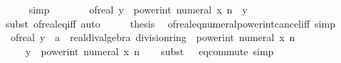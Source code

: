 \begin{isabellebody}
\ \ \ \ \isamarkupfalse%
\ simp\isanewline
\ \ \isamarkupfalse%
\ \isamarkupfalse%
\ {\isachardoublequoteopen}{\isasymdots}\ {\isacharequal}{\kern0pt}\ of{\isacharunderscore}{\kern0pt}real\ y\ {\isasymlongleftrightarrow}\ power{\isacharunderscore}{\kern0pt}int\ {\isacharparenleft}{\kern0pt}numeral\ x{\isacharparenright}{\kern0pt}\ n\ {\isacharequal}{\kern0pt}\ y{\isachardoublequoteclose}\isanewline
\ \ \ \ \isamarkupfalse%
\ {\isacharparenleft}{\kern0pt}subst\ of{\isacharunderscore}{\kern0pt}real{\isacharunderscore}{\kern0pt}eq{\isacharunderscore}{\kern0pt}iff{\isacharparenright}{\kern0pt}\ auto\isanewline
\ \ \isamarkupfalse%
\ \isamarkupfalse%
\ {\isacharquery}{\kern0pt}thesis\ \isacommand{{\isachardot}{\kern0pt}}\isamarkupfalse%
\isanewline
{}\isamarkupfalse%
%
\endisatagproof
{\isafoldproof}%
%
\isadelimproof
\isanewline
%
\endisadelimproof
\isanewline
{}\isamarkupfalse%
\ of{\isacharunderscore}{\kern0pt}real{\isacharunderscore}{\kern0pt}eq{\isacharunderscore}{\kern0pt}numeral{\isacharunderscore}{\kern0pt}power{\isacharunderscore}{\kern0pt}int{\isacharunderscore}{\kern0pt}cancel{\isacharunderscore}{\kern0pt}iff\ {\isacharbrackleft}{\kern0pt}simp{\isacharbrackright}{\kern0pt}{\isacharcolon}{\kern0pt}\isanewline
\ \ {\isachardoublequoteopen}{\isacharparenleft}{\kern0pt}of{\isacharunderscore}{\kern0pt}real\ y\ {\isacharcolon}{\kern0pt}{\isacharcolon}{\kern0pt}\ {\isacharprime}{\kern0pt}a\ {\isacharcolon}{\kern0pt}{\isacharcolon}{\kern0pt}\ {\isacharbraceleft}{\kern0pt}real{\isacharunderscore}{\kern0pt}div{\isacharunderscore}{\kern0pt}algebra{\isacharcomma}{\kern0pt}\ division{\isacharunderscore}{\kern0pt}ring{\isacharbraceright}{\kern0pt}{\isacharparenright}{\kern0pt}\ {\isacharequal}{\kern0pt}\ power{\isacharunderscore}{\kern0pt}int\ {\isacharparenleft}{\kern0pt}numeral\ x{\isacharparenright}{\kern0pt}\ n\ {\isasymlongleftrightarrow}\isanewline
\ \ \ \ \ y\ {\isacharequal}{\kern0pt}\ power{\isacharunderscore}{\kern0pt}int\ {\isacharparenleft}{\kern0pt}numeral\ x{\isacharparenright}{\kern0pt}\ n{\isachardoublequoteclose}\isanewline
%
\isadelimproof
\ \ %
\endisadelimproof
%
\isatagproof
{}\isamarkupfalse%
\ {\isacharparenleft}{\kern0pt}subst\ {\isacharparenleft}{\kern0pt}{}\ {}{\isacharparenright}{\kern0pt}\ eq{\isacharunderscore}{\kern0pt}commute{\isacharparenright}{\kern0pt}\ simp%
\endisatagproof
{\isafoldproof}%
%
\isadelimproof
\isanewline
%
\endisadelimproof
\isanewline
{}\isamarkupfalse%

\end{isabellebody}
